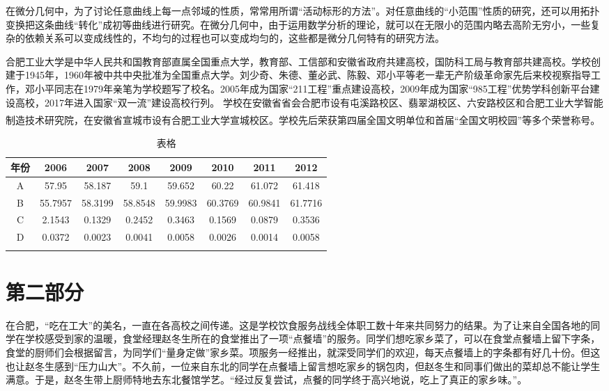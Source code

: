 \documentclass{article}
\newcommand{\upcite}[1]{\textsuperscript{\textsuperscript{\cite{#1}}}}
\begin{document}
在微分几何中，为了讨论任意曲线上每一点邻域的性质，常常用所谓“活动标形的方法”。对任意曲线的“小范围”性质的研究，还可以用拓扑变换把这条曲线“转化”成初等曲线进行研究。在微分几何中，由于运用数学分析的理论，就可以在无限小的范围内略去高阶无穷小，一些复杂的依赖关系可以变成线性的，不均匀的过程也可以变成均匀的，这些都是微分几何特有的研究方法。


合肥工业大学是中华人民共和国教育部直属全国重点大学，教育部、工信部和安徽省政府共建高校，国防科工局与教育部共建高校。学校创建于1945年，1960年被中共中央批准为全国重点大学。刘少奇、朱德、董必武、陈毅、邓小平等老一辈无产阶级革命家先后来校视察指导工作，邓小平同志在1979年亲笔为学校题写了校名。2005年成为国家“211工程”重点建设高校，2009年成为国家“985工程”优势学科创新平台建设高校，2017年进入国家“双一流”建设高校行列。
学校在安徽省省会合肥市设有屯溪路校区、翡翠湖校区、六安路校区和合肥工业大学智能制造技术研究院，在安徽省宣城市设有合肥工业大学宣城校区。学校先后荣获第四届全国文明单位和首届“全国文明校园”等多个荣誉称号\upcite{bib:one}。
\begin{table}[H]
	\caption{表格}
	\centering
	\begin{tabular}{cccccccc}
		\toprule[1.5pt]
		年份  & 2006&2007&2008&2009&2010 & 2011 & 2012 \\
		\midrule
		A&57.95&58.187&59.1&59.652&60.22&61.072&61.418 \\
		B &55.7957 &58.3199&58.8548&59.9983&60.3769 &60.9841 &61.7716 \\		
		C&2.1543&0.1329&0.2452&0.3463&0.1569&0.0879&0.3536 \\		
		D&0.0372 &0.0023&0.0041&0.0058&0.0026&0.0014&0.0058 \\
		\bottomrule[1.5pt]
		\label{tab1}
	\end{tabular}
\end{table}
\section{第二部分}
在合肥，“吃在工大”的美名，一直在各高校之间传递。这是学校饮食服务战线全体职工数十年来共同努力的结果。为了让来自全国各地的同学在学校感受到家的温暖，食堂经理赵冬生所在的食堂推出了一项“点餐墙”的服务。同学们想吃家乡菜了，可以在食堂点餐墙上留下字条，食堂的厨师们会根据留言，为同学们“量身定做”家乡菜。项服务一经推出，就深受同学们的欢迎，每天点餐墙上的字条都有好几十份。但这也让赵冬生感到“压力山大”。不久前，一位来自东北的同学在点餐墙上留言想吃家乡的锅包肉，但赵冬生和同事们做出的菜却总不能让学生满意。于是，赵冬生带上厨师特地去东北餐馆学艺。“经过反复尝试，点餐的同学终于高兴地说，吃上了真正的家乡味。”。
\end{document}
